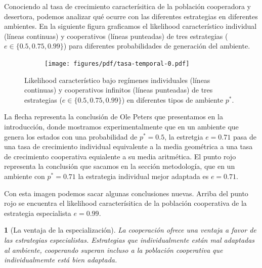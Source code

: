 \documentclass[a4paper,10pt]{article}
\newif\ifen
\newif\ifes
\newcommand{\en}[1]{\ifen#1\fi}
\newcommand{\es}[1]{\ifes#1\fi}
\newtheorem{conclution}{\en{Conclution}\es{Conclusión}}%
\begin{document}
{Conociendo al tasa de crecimiento caracterísitica de la población cooperadora y desertora, podemos analizar qué ocurre con las diferentes estrategias en diferentes ambientes.
En la siguiente figura graficamos el likelihood característico individual (líneas continuas) y cooperativos (líneas punteadas) de tres estrategias ($e \in \{0.5, 0.75, 0.99\}$) para diferentes probabilidades de generación del ambiente.
%
\begin{figure}[H]
    \centering
    \begin{subfigure}[b]{0.66\textwidth}
    \texttt{[image: figures/pdf/tasa-temporal-0.pdf]}
    \end{subfigure}
    \caption{Likelihood característico bajo regímenes individuales (líneas continuas) y cooperativos infinitos (líneas punteadas) de tres estrategias ($e \in \{0.5, 0.75, 0.99\}$) en diferentes tipos de ambiente $p^*$.}
    \label{fig:fitness_temporal}
\end{figure}
%
La flecha representa la conclusión de Ole Peters que presentamos en la introducción, donde mostramos experimentalmente que en un ambiente que genera los estados con una probabilidad de $p^* = 0.5$, la estretgia $e=0.71$ pasa de una tasa de crecimiento individual equivalente a la media geométrica a una tasa de crecimiento cooperativa equialente a su media aritmética.
El punto rojo representa la conclusión que sacamos en la sección metodología, que en un ambiente con $p^*=0.71$ la estrategia individual mejor adaptada es $e=0.71$.


Con esta imagen podemos sacar algunas conclusiones nuevas.
Arriba del punto rojo se encuentra el likelihood caracterísitica de la población cooperativa de la estrategia especialista $e=0.99$.

\begin{conclution}[La ventaja de la especialización]
La cooperación ofrece una ventaja a favor de las estrategias especialistas. Estrategias que individualmente están mal adaptadas al ambiente, cooperando superan incluso a la población cooperativa que individualmemte está bien adaptada.
\end{conclution}

}
\end{document}
